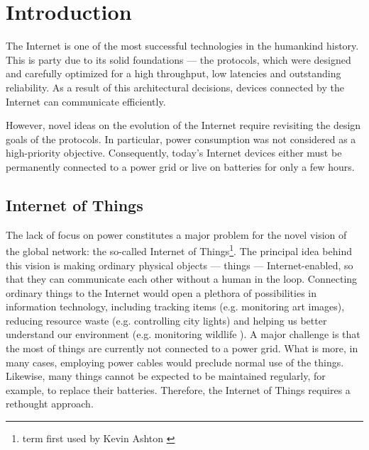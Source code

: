 \chapter{Introduction}

The Internet is one of the most successful technologies in the humankind history.
This is party due to its solid foundations --- the protocols, which were designed and carefully optimized for a high throughput, low latencies and outstanding reliability.
As a result of this architectural decisions, devices connected by the Internet can communicate efficiently.

However, novel ideas on the evolution of the Internet require revisiting the design goals of the protocols.
In particular, power consumption was not considered as a high-priority objective.
Consequently, today's Internet devices either must be permanently connected to a power grid or live on batteries for only a few hours.

\section{Internet of Things}

The lack of focus on power constitutes a major problem for the novel vision of the global network: the so-called Internet of Things\footnote{term first used by Kevin Ashton \cite{InternetOfThings}}.
The principal idea behind this vision is making ordinary physical objects --- things --- Internet-enabled, so that they can communicate each other without a human in the loop.
Connecting ordinary things to the Internet would open a plethora of possibilities in information technology, including tracking items (e.g. monitoring art images), reducing resource waste (e.g. controlling city lights) and helping us better understand our environment (e.g. monitoring wildlife \cite{liu2009long}).
A major challenge is that the most of things are currently not connected to a power grid.
What is more, in many cases, employing power cables would preclude normal use of the things.
Likewise, many things cannot be expected to be maintained regularly, for example, to replace their batteries.
Therefore, the Internet of Things requires a rethought approach.


